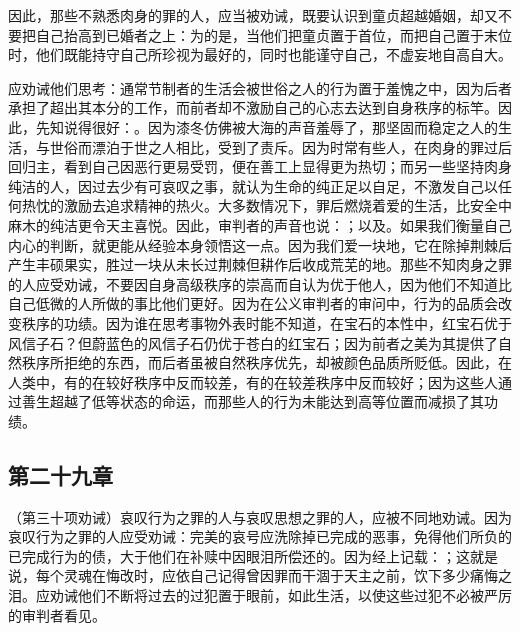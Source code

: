 因此，那些不熟悉肉身的罪的人，应当被劝诫，既要认识到童贞超越婚姻，却又不要把自己抬高到已婚者之上：为的是，当他们把童贞置于首位，而把自己置于末位时，他们既能持守自己所珍视为最好的，同时也能谨守自己，不虚妄地自高自大。\par

应劝诫他们思考：通常节制者的生活会被世俗之人的行为置于羞愧之中，因为后者承担了超出其本分的工作，而前者却不激励自己的心志去达到自身秩序的标竿。因此，先知说得很好：。因为漆冬仿佛被大海的声音羞辱了，那坚固而稳定之人的生活，与世俗而漂泊于世之人相比，受到了责斥。因为时常有些人，在肉身的罪过后回归主，看到自己因恶行更易受罚，便在善工上显得更为热切；而另一些坚持肉身纯洁的人，因过去少有可哀叹之事，就认为生命的纯正足以自足，不激发自己以任何热忱的激励去追求精神的热火。大多数情况下，罪后燃烧着爱的生活，比安全中麻木的纯洁更令天主喜悦。因此，审判者的声音也说：；以及。如果我们衡量自己内心的判断，就更能从经验本身领悟这一点。因为我们爱一块地，它在除掉荆棘后产生丰硕果实，胜过一块从未长过荆棘但耕作后收成荒芜的地。那些不知肉身之罪的人应受劝诫，不要因自身高级秩序的崇高而自认为优于他人，因为他们不知道比自己低微的人所做的事比他们更好。因为在公义审判者的审问中，行为的品质会改变秩序的功绩。因为谁在思考事物外表时能不知道，在宝石的本性中，红宝石优于风信子石？但蔚蓝色的风信子石仍优于苍白的红宝石；因为前者之美为其提供了自然秩序所拒绝的东西，而后者虽被自然秩序优先，却被颜色品质所贬低。因此，在人类中，有的在较好秩序中反而较差，有的在较差秩序中反而较好；因为这些人通过善生超越了低等状态的命运，而那些人的行为未能达到高等位置而减损了其功绩。\par


\subsection{第二十九章}

\par

（第三十项劝诫）哀叹行为之罪的人与哀叹思想之罪的人，应被不同地劝诫。因为哀叹行为之罪的人应受劝诫：完美的哀号应洗除掉已完成的恶事，免得他们所负的已完成行为的债，大于他们在补赎中因眼泪所偿还的。因为经上记载：；这就是说，每个灵魂在悔改时，应依自己记得曾因罪而干涸于天主之前，饮下多少痛悔之泪。应劝诫他们不断将过去的过犯置于眼前，如此生活，以使这些过犯不必被严厉的审判者看见。\par

